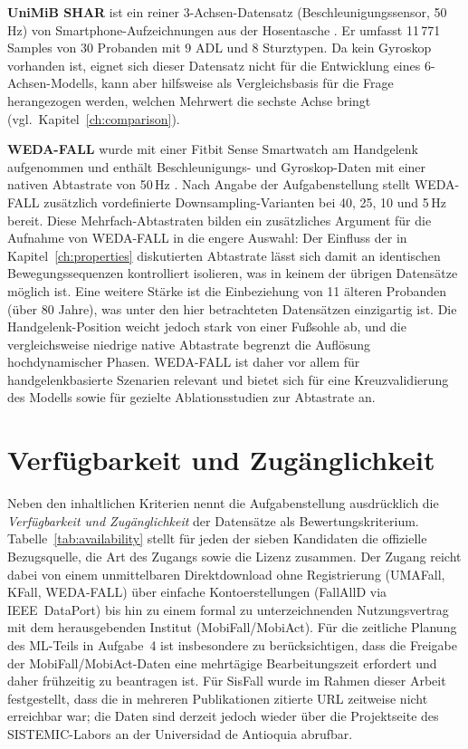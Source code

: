 \documentclass[11pt,a4paper,oneside]{report}
\begin{document}
\textbf{UniMiB SHAR} ist ein reiner 3-Achsen-Datensatz
(Beschleunigungssensor, 50\,Hz) von Smartphone-Aufzeichnungen aus der
Hosentasche \cite{unimib2017}. Er umfasst 11\,771 Samples von 30 Probanden mit
9 ADL und 8 Sturztypen. Da kein Gyroskop vorhanden ist, eignet sich dieser
Datensatz nicht für die Entwicklung eines 6-Achsen-Modells, kann aber
hilfsweise als Vergleichsbasis für die Frage herangezogen werden, welchen
Mehrwert die sechste Achse bringt (vgl.\ Kapitel~\ref{ch:comparison}).

\textbf{WEDA-FALL} wurde mit einer Fitbit Sense Smartwatch am Handgelenk
aufgenommen und enthält Beschleunigungs- und Gyroskop-Daten mit einer
nativen Abtastrate von 50\,Hz \cite{wedafall2023}. Nach Angabe der
Aufgabenstellung stellt WEDA-FALL zusätzlich vordefinierte
Downsampling-Varianten bei 40, 25, 10 und 5\,Hz bereit. Diese
Mehrfach-Abtastraten bilden ein zusätzliches Argument für die Aufnahme
von WEDA-FALL in die engere Auswahl: Der Einfluss der in
Kapitel~\ref{ch:properties} diskutierten Abtastrate lässt sich damit an
identischen Bewegungssequenzen kontrolliert isolieren, was in keinem der
übrigen Datensätze möglich ist. Eine weitere Stärke ist die Einbeziehung
von 11 älteren Probanden (über 80 Jahre), was unter den hier betrachteten
Datensätzen einzigartig ist. Die Handgelenk-Position weicht jedoch stark
von einer Fußsohle ab, und die vergleichsweise niedrige native
Abtastrate begrenzt die Auflösung hochdynamischer Phasen. WEDA-FALL ist
daher vor allem für handgelenkbasierte Szenarien relevant und bietet
sich für eine Kreuzvalidierung des Modells sowie für gezielte
Ablationsstudien zur Abtastrate an.

\section{Verfügbarkeit und Zugänglichkeit}
\label{sec:dataset_availability}

Neben den inhaltlichen Kriterien nennt die Aufgabenstellung ausdrücklich
die \emph{Verfügbarkeit und Zugänglichkeit} der Datensätze als
Bewertungskriterium. Tabelle~\ref{tab:availability} stellt für jeden der
sieben Kandidaten die offizielle Bezugsquelle, die Art des Zugangs sowie
die Lizenz zusammen. Der Zugang reicht dabei von einem unmittelbaren
Direktdownload ohne Registrierung (UMAFall, KFall, WEDA-FALL) über
einfache Kontoerstellungen (FallAllD via IEEE~DataPort) bis hin zu einem
formal zu unterzeichnenden Nutzungsvertrag mit dem herausgebenden Institut
(MobiFall/MobiAct). Für die zeitliche Planung des ML-Teils in Aufgabe~4
ist insbesondere zu berücksichtigen, dass die Freigabe der
MobiFall/MobiAct-Daten eine mehrtägige Bearbeitungszeit erfordert und
daher frühzeitig zu beantragen ist. Für SisFall wurde im Rahmen dieser
Arbeit festgestellt, dass die in mehreren Publikationen zitierte URL
zeitweise nicht erreichbar war; die Daten sind derzeit jedoch wieder über
die Projektseite des SISTEMIC-Labors an der Universidad de Antioquia
abrufbar.
\end{document}
